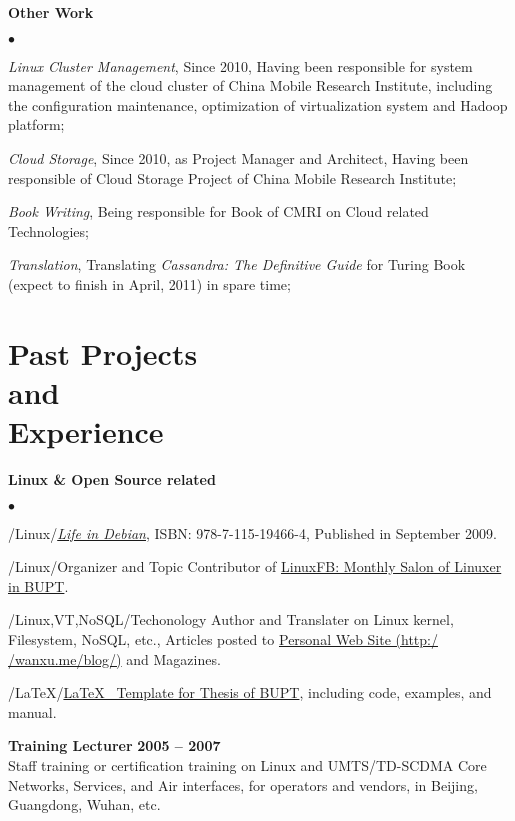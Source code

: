 \documentclass[a4paper,margin,line]{res}
\newenvironment{list2}{
  \begin{list}{$\bullet$}{%
      \setlength{\itemsep}{0in}
      \setlength{\parsep}{0in} \setlength{\parskip}{0in}
      \setlength{\topsep}{0in} \setlength{\partopsep}{0in} 
      \setlength{\leftmargin}{0.2in}}}{\end{list}}
\begin{document}
\begin{resume}
\textbf{Other Work}\\
\vspace*{-.1in}
\begin{list2}
\item \textit{Linux Cluster Management}, \enskip Since 2010, Having been responsible for system management of the cloud cluster of China Mobile Research Institute, including the configuration maintenance, optimization of virtualization system and Hadoop platform;
\item \textit{Cloud Storage}, \enskip Since 2010, as Project Manager and Architect, Having been responsible of Cloud Storage Project of China Mobile Research Institute;
\item \textit{Book Writing}, \enskip Being responsible for Book of CMRI on Cloud related Technologies; 
\item \textit{Translation}, \enskip Translating {\it Cassandra: The Definitive Guide}\/ for Turing Book (expect to finish in April, 2011) in spare time;
\end{list2}

\section{\sc Past Projects\\ and\\ Experience}

\textbf{Linux \& Open Source related}\\
\vspace*{-.1in}
\begin{list2}
\item /Linux/\enskip \href{http://wangxu.me/blog/?page\_id=168}{\textit{Life in Debian}}, ISBN: 978-7-115-19466-4, Published in September 2009. 
\item /Linux/\enskip Organizer and Topic Contributor of \href{http://linuxfb.org}{LinuxFB: Monthly Salon of Linuxer in BUPT}.
\item /Linux,VT,NoSQL/\enskip Techonology Author and Translater on Linux kernel, Filesystem, NoSQL, etc., Articles posted to \href{http://wangxu.me/blog/}{Personal Web Site (http:/$\!$/wanxu.me/blog/)} and Magazines.
\item /\LaTeX/\enskip \href{http://code.google.com/p/latex-bupt}{\LaTeX\mbox{ } Template for Thesis of BUPT}, including code, examples, and manual. 
\end{list2}

{\bf Training Lecturer} \hfill {\bf 2005 -- 2007}\\
Staff training or certification training on Linux and UMTS/TD-SCDMA Core Networks, Services, and Air interfaces, for operators and vendors, in Beijing, Guangdong, Wuhan, etc.


\end{resume}
\end{document}
